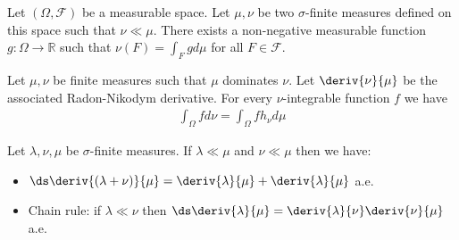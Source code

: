 
	\begin{theorem}
		Let $(\Omega,\mathcal{F})$ be a measurable space. Let $\mu,\nu$ be two $\sigma$-finite measures defined on this space such that $\nu\ll\mu$. There exists a non-negative measurable function $g:\Omega\rightarrow\mathbb{R}$ such that $\nu(F) = \int_F gd\mu$ for all $F\in\mathcal{F}$.
	\end{theorem}

	\begin{property}
		Let $\mu, \nu$ be finite measures such that $\mu$ dominates $\nu$. Let $\deriv{\nu}{\mu}$ be the associated Radon-Nikodym derivative. For every $\nu$-integrable function $f$ we have
        	\begin{gather}
			\int_\Omega fd\nu = \int_\Omega fh_\nu d\mu
		\end{gather}
	\end{property}

	\begin{property}
    		Let $\lambda,\nu,\mu$ be $\sigma$-finite measures. If $\lambda\ll\mu$ and $\nu\ll\mu$ then we have:
	        \begin{itemize}
			\item $\ds\deriv{(\lambda+\nu)}{\mu} = \deriv{\lambda}{\mu} + \deriv{\lambda}{\mu}$ a.e.
			\item Chain rule: if $\lambda\ll\nu$ then $\ds\deriv{\lambda}{\mu} = \deriv{\lambda}{\nu}\deriv{\nu}{\mu}$ a.e.
        	\end{itemize}
	\end{property}